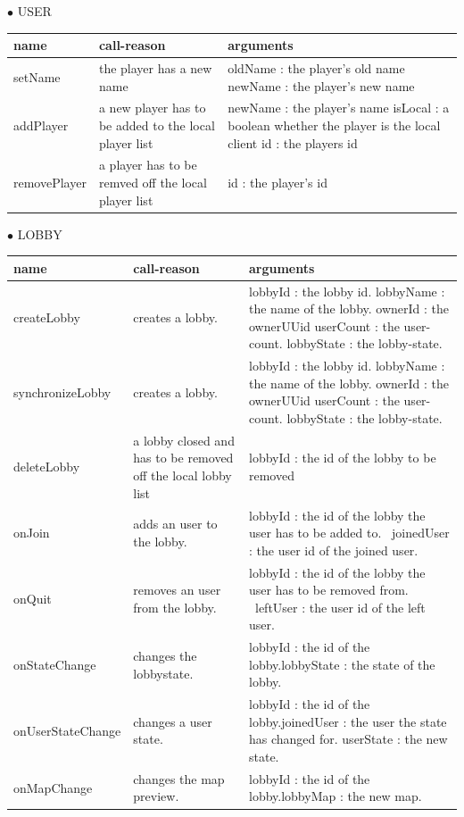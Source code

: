 \documentclass{scrartcl}
\newcommand{\n}{\newline}
\begin{document}
$\bullet$ USER
\begin{center}
    \begin{tabular}{| p{3.1cm} | p{5cm} | p{5.9cm} |}
        \hline
        \textbf{name} & \textbf{call-reason} & \textbf{arguments} \\ \hline
        setName & the player has a new name & oldName : the player's old name \n
        newName : the player's new name \\ \hline

        addPlayer & a new player has to be added to the local player list & newName : the player's name \n
        isLocal : a boolean whether the player is the local client \n
        id : the players id \\ \hline

        removePlayer & a player has to be remved off the local player list & id : the player's id \\ \hline 
    \end{tabular}
\end{center}
$\bullet$ LOBBY
\begin{center}
    \begin{tabular}{| p{3.1cm} | p{5cm} | p{5.9cm} |}
        \hline
        \textbf{name} & \textbf{call-reason} & \textbf{arguments} \\ \hline
        createLobby & creates a lobby. & lobbyId : the lobby id. \n lobbyName : the name of the lobby. \n ownerId : the ownerUUid \n userCount : the user-count. \n lobbyState : the lobby-state.\\ \hline
        synchronizeLobby & creates a lobby. & lobbyId : the lobby id. \n lobbyName : the name of the lobby. \n ownerId : the ownerUUid \n userCount : the user-count. \n lobbyState : the lobby-state.\\ \hline
        deleteLobby & a lobby closed and has to be removed off the local lobby list & lobbyId : the id of the lobby to be removed \\ \hline
        onJoin & adds an user to the lobby. & lobbyId : the id of the lobby the user has to be added to. \ joinedUser : the user id of the joined user. \\ \hline
        onQuit & removes an user from the lobby. & lobbyId : the id of the lobby the user has to be removed from. \ leftUser : the user id of the left user. \\ \hline
        onStateChange & changes the lobbystate. & lobbyId : the id of the lobby.\n lobbyState : the state of the lobby. \\ \hline
        onUserStateChange &changes a user state. & lobbyId : the id of the lobby.\n joinedUser : the user the state has changed for. \n userState : the new state. \\ \hline
        onMapChange & changes the map preview. & lobbyId : the id of the lobby.\n lobbyMap : the new map. \\ \hline
        
    \end{tabular}
\end{center}
\end{document}
